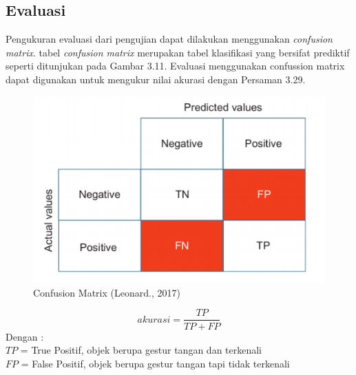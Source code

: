 \subsection{Evaluasi}
Pengukuran evaluasi dari pengujian dapat dilakukan menggunakan \emph{confusion matrix}. tabel \emph{confusion matrix} merupakan tabel klasifikasi yang bersifat prediktif seperti ditunjukan pada Gambar 3.11. Evaluasi menggunakan confussion matrix dapat digunakan untuk mengukur nilai akurasi dengan Persaman 3.29.
\begin{figure}[H]
\centering
\includegraphics[width=0.7\linewidth]{confusion}
\caption{Confusion Matrix (Leonard., 2017)}
\label{fig:confusion}
\end{figure}
\begin{equation}
akurasi = \frac{TP}{TP+FP}
\end{equation}
Dengan :\\
$TP$ = True Positif, objek berupa gestur tangan dan terkenali\\
$FP$ = False Positif, objek berupa gestur tangan tapi tidak terkenali
